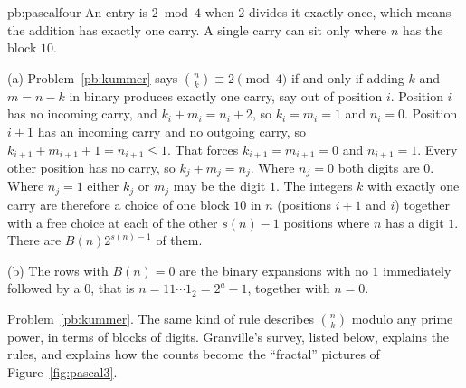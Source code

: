 \begin{solution}{pb:pascalfour}
\idea An entry is $2\bmod4$ when $2$ divides it exactly once, which means the addition has exactly one carry. A single carry can sit
only where $n$ has the block $10$.

\writeup (a) Problem~\ref{pb:kummer} says $\binom nk\equiv2\pmod4$ if and only if adding $k$ and $m=n-k$ in binary produces exactly one carry,
say out of position $i$. Position $i$ has no incoming carry, and $k_i+m_i=n_i+2$, so $k_i=m_i=1$ and $n_i=0$. Position
$i+1$ has an incoming carry and no outgoing carry, so $k_{i+1}+m_{i+1}+1=n_{i+1}\le1$. That forces $k_{i+1}=m_{i+1}=0$ and
$n_{i+1}=1$. Every other position has no carry, so $k_j+m_j=n_j$. Where $n_j=0$ both digits are $0$. Where $n_j=1$
either $k_j$ or $m_j$ may be the digit $1$. The integers $k$ with exactly one carry are therefore a choice of one block $10$ in $n$ (positions
$i+1$ and $i$) together with a free choice at each of the other $s(n)-1$ positions where $n$ has a digit $1$. There are $B(n)2^{s(n)-1}$ of them.

(b) The rows with $B(n)=0$ are the binary expansions with no $1$ immediately followed by a $0$, that is $n=11\cdots1_2=2^a-1$, together with $n=0$.

\tools Problem~\ref{pb:kummer}.
\leads The same kind of rule describes $\binom nk$ modulo any prime power, in terms of blocks of digits. Granville's survey, listed
below, explains the rules, and explains how the counts become the ``fractal'' pictures of Figure~\ref{fig:pascal3}.
\end{solution}

